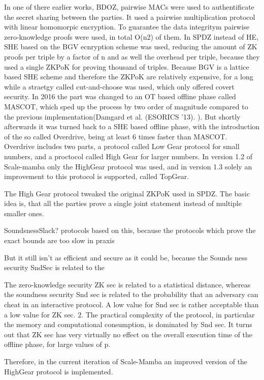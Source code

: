 \documentclass[english,runningheads,a4paper]{llncs}[2018/03/10]
\begin{document}
In one of there earlier works, BDOZ, pairwise MACs were used to authentificate the secret sharing between the parties. It used a pairwise multiplication protocol with linear homomorpic encryption. To guarantee the data integritym pairwise zero-knowledge proofs were used, in total O(n2) of them. 
In SPDZ instead of HE, SHE based on the BGV ecnryption scheme was used, reducing the amount of ZK proofs per triple by a factor of n and as well the overhead per triple, because they used a single ZKPoK for proving thousand of triples.
Because BGV is a lattice based SHE scheme and therefore the ZKPoK are relatively expensive, for a long while a straetgy called cut-and-choose was used, which only offered covert security. 
In 2016 the part was changed to an OT based offline phase called MASCOT, which sped up tbe process by two order of magnitude compared to the previous implementation(Damgard et al. (ESORICS ’13). ).
But shortly afterwards it was turned back to a SHE based offline phase, with the introduction of the so called Overdrive, being at least 6 times faster than MASCOT. Overdrive includes two parts, a protocol called Low Gear protocol for small numbers, and a proctocol called High Gear for larger numbers. In version 1.2 of Scale-mamba only the HighGear protocol was used, and in version 1.3 solely an improvement to this protocol is supported, called TopGear.




The High Gear protocol tweaked the original ZKPoK used in SPDZ. The basic idea is, that all the parties prove a single joint statement instead of multiple smaller ones.

SoundsnessSlack? protocols based on this, because the protocols which prove the exact bounds are too slow in praxis

But it still isn't as efficient and secure as it could be, because the Sounds ness security SndSec is related to the 

The zero-knowledge security ZK sec is related to a statistical distance, whereas the soundness security Snd sec is related to the probability that an adversary can cheat in an interactive protocol. A low value for Snd sec is rather acceptable than a low value for ZK sec. 2. The practical complexity of the protocol, in particular the memory and computational consumption, is dominated by Snd sec. It turns out that ZK sec has very virtually no effect on the overall execution time of the offline phase, for large values of p.

Therefore, in the current iteration of Scale-Mamba an improved version of the HighGear protocol is implemented.
\end{document}
